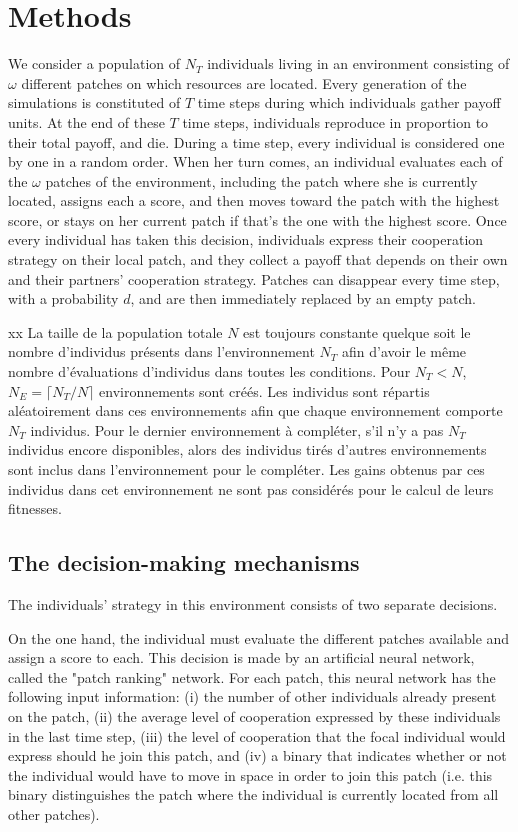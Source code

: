 \documentclass[twocolumn]{article}
\begin{document}
\section{Methods}

We consider a population of $N_T$ individuals living in an environment consisting of $\omega$ different patches on which resources are located. Every generation of the simulations is constituted of $T$ time steps during which individuals gather payoff units. At the end of these $T$ time steps, individuals reproduce in proportion to their total payoff, and die. During a time step, every individual is considered one by one in a random order. When her turn comes, an individual evaluates each of the $\omega$ patches of the environment, including the patch where she is currently located, assigns each a score, and then moves toward the patch with the highest score, or stays on her current patch if that's the one with the highest score. Once every individual has taken this decision, individuals express their cooperation strategy on their local patch, and they collect a payoff that depends on their own and their partners' cooperation strategy. Patches can disappear every time step, with a probability $d$, and are then immediately replaced by an empty patch.

xx La taille de la population totale $N$ est toujours constante quelque soit le nombre d'individus présents dans l'environnement $N_T$ afin d'avoir le même nombre d'évaluations d'individus dans toutes les conditions. Pour $N_T < N$, $N_E = \lceil N_T / N \rceil$ environnements sont créés. Les individus sont répartis aléatoirement dans ces environnements afin que chaque environnement comporte $N_T$ individus. Pour le dernier environnement à compléter, s'il n'y a pas $N_T$ individus encore disponibles, alors des individus tirés d'autres environnements sont inclus dans l'environnement pour le compléter. Les gains obtenus par ces individus dans cet environnement ne sont pas considérés pour le calcul de leurs fitnesses.

\subsection{The decision-making mechanisms}

The individuals' strategy in this environment consists of two separate decisions.

On the one hand, the individual must evaluate the different patches available and assign a score to each. This decision is made by an artificial neural network, called the "patch ranking" network. For each patch, this neural network has the following input information: (i) the number of other individuals already present on the patch, (ii) the average level of cooperation expressed by these individuals in the last time step, (iii) the level of cooperation that the focal individual would express should he join this patch, and (iv) a binary that indicates whether or not the individual would have to move in space in order to join this patch (i.e. this binary distinguishes the patch where the individual is currently located from all other patches).
\end{document}

